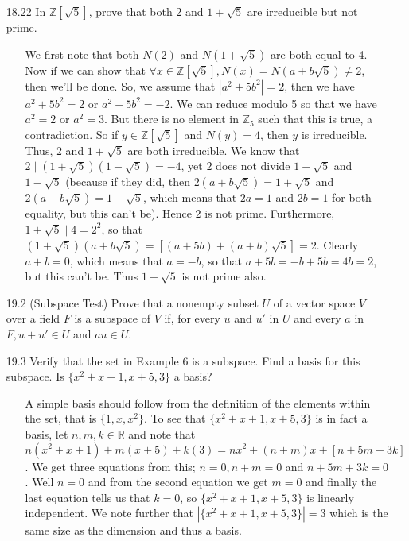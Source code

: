 \documentclass[12pt]{article}
\begin{document}
\begin{enumerate}
\item[18.22] In $\mathbb{Z}[\sqrt{5}]$, prove that both 2 and $1 + \sqrt{5}$ are irreducible
but not prime.
\begin{enumerate}
\item[] We first note that both $N(2)$ and $N(1 + \sqrt{5})$ are both equal to 4. Now if we can show that 
$\forall x \in \mathbb{Z}[\sqrt{5}], N(x) = N(a + b\sqrt{5}) \neq 2$, then we'll be done. So, we assume that
$|a^2 + 5b^2| = 2$, then we have $a^2 + 5b^2 = 2$ or $a^2 + 5b^2 = -2$. We can reduce modulo 5 so that
we have $a^2 = 2$ or $a^2 = 3$. But there is no element in $\mathbb{Z}_5$ such that this is true, a contradiction.
So if $y \in \mathbb{Z}[\sqrt{5}]$ and $N(y) = 4$, then $y$ is irreducible. Thus, 2 and $1 + \sqrt{5}$ are both
irreducible. We know that $2 \mid (1 + \sqrt{5})(1 - \sqrt{5}) = -4$, yet $2$ does not divide 
$1 + \sqrt{5}$ and $1 - \sqrt{5}$ (because if they did, then $2(a + b\sqrt{5}) = 1 + \sqrt{5}$ and $2(a + b\sqrt{5}) = 
1 - \sqrt{5}$, which means that $2a = 1$ and $2b = 1$ for both equality, but this can't be). Hence $2$ is not prime.
Furthermore, $1 + \sqrt{5} \mid 4 = 2^2$, so that $(1 + \sqrt{5})(a + b\sqrt{5}) = [(a + 5b) + (a + b)\sqrt{5}] = 2$.
Clearly $a + b = 0$, which means that $a = -b$, so that $a + 5b = -b + 5b = 4b = 2$, but this can't be. Thus
$1 + \sqrt{5}$ is not prime also.
\end{enumerate}

\item[19.2] (Subspace Test) Prove that a nonempty subset $U$ of a vector space $V$ over a field $F$ is a subspace of $V$ if, for every $u$ and $u'$ in $U$ and every $a$ in $F, u + u' \in U$ and $au \in U$.
\begin{enumerate}
\item[] 
\end{enumerate}

\item[19.3] Verify that the set in Example 6 is a subspace. Find a basis for this subspace. Is $\{x^2 + x + 1, x+5, 3\}$ a basis?
\begin{enumerate}
\item[] A simple basis should follow from the definition of the elements within the set, that is $\{1, x, x^2\}$. To see that $\{x^2 + x + 1, x+5, 3\}$ is in fact a basis, let $n, m, k \in \mathbb{R}$ and note that $n(x^2+x+1) + m(x+5) + k(3) = nx^2 + (n+m)x+[n+5m+3k]$. We get three equations from this; $n=0, n+m=0$ and $n+5m+3k=0$. Well $n=0$ and from the second equation we get $m=0$ and finally the last equation tells us that $k=0$, so $\{x^2 + x + 1, x+5, 3\}$ is linearly independent. We note further that $|\{x^2 + x + 1, x+5, 3\}| = 3$ which is the same size as the dimension and thus a basis.
\end{enumerate}


\end{enumerate}
\end{document}
